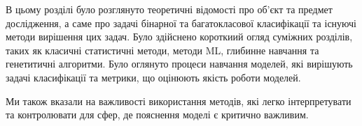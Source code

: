 \chapconclude{\ref{chap:review}}

В цьому розділі було розглянуто теоретичні відомості про об'єкт та предмет дослідження, а саме про задачі бінарної та багатокласової класифікації та існуючі методи вирішення цих задач. Було здійснено короткиий огляд суміжних розділів, таких як класичні статистичні методи, методи ML, глибинне навчання та генетитичні алгоритми. Було оглянуто процеси навчання моделей, які вирішують задачі класифікації та метрики, що оцінюють якість роботи моделей.

Ми також вказали на важливості використання методів, які легко інтерпретувати та контролювати для сфер, де пояснення моделі є критично важливим.